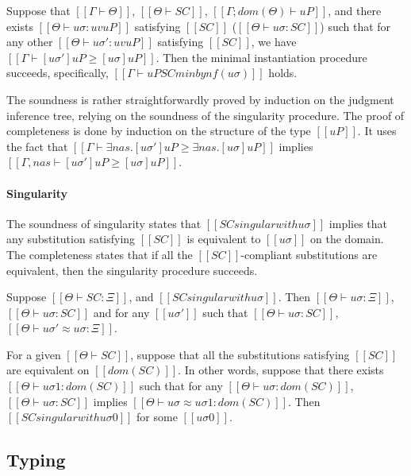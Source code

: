 \begin{lemma*}
    Suppose that $[[Γ ⊢ Θ]]$, $[[Θ ⊢ SC]]$, $[[Γ; dom(Θ) ⊢ uP]]$, and there exists 
    $[[Θ ⊢ uσ : uv uP ]]$ satisfying $[[SC]]$ ($[[Θ ⊢ uσ : SC]]$) 
    such that for any other $[[Θ ⊢ uσ' : uv uP ]]$
    satisfying $[[SC]]$, we have
    $[[Γ ⊢ [uσ']uP ≥ [uσ]uP ]]$.  Then the minimal instantiation procedure  
    succeeds, specifically, $[[Γ ⊢ uP SC minby nf(uσ) ]]$ holds.
\end{lemma*}

The soundness is rather straightforwardly proved by induction on the 
judgment inference tree, relying on the soundness of the singularity procedure.
The proof of completeness is done by induction on the structure of the type $[[uP]]$.
It uses the fact that $[[ Γ ⊢ ∃nas.[uσ']uP ≥ ∃nas.[uσ]uP]]$ implies
$[[ Γ, nas ⊢ [uσ']uP ≥ [uσ]uP]]$.


\paragraph{Singularity}
The soundness of singularity states that $[[SC singular with uσ]]$
implies that any substitution satisfying $[[SC]]$ is equivalent to $[[uσ]]$ 
on the domain.  The completeness states that if all the 
$[[SC]]$-compliant substitutions are equivalent, then the singularity procedure succeeds. 

\begin{lemma*}
    \label{lemma:singularity-soundness}
    Suppose $[[Θ ⊢ SC : Ξ]]$, and $[[SC singular with uσ]]$. 
    Then $[[ Θ ⊢ uσ : Ξ ]]$,
     $[[ Θ ⊢ uσ : SC ]]$ and for any 
    $[[uσ']]$ such that $[[Θ ⊢ uσ : SC]]$,
    $[[Θ ⊢ uσ' ≈ uσ : Ξ]]$.
\end{lemma*}

\begin{lemma*}
    \label{lemma:singularity-completeness}
    For a given $[[Θ ⊢ SC]]$,
    suppose that all the substitutions satisfying $[[SC]]$ are equivalent
    on $[[dom(SC)]]$.
    In other words, suppose that there exists $[[Θ ⊢ uσ1 : dom(SC)]]$ such that
    for any $[[Θ ⊢ uσ : dom(SC)]]$, $[[Θ ⊢ uσ : SC]]$ implies 
    $[[Θ ⊢ uσ ≈ uσ1 : dom(SC)]]$.
    Then\footnotemark[1] $[[SC singular with uσ0]]$ for some $[[uσ0]]$.
\end{lemma*}

\subsection{Typing}

